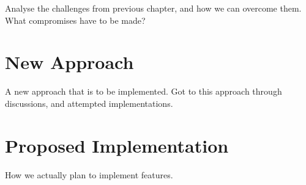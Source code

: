 Analyse the challenges from previous chapter, and how we can overcome them.
What compromises have to be made?

\section{New Approach}

A new approach that is to be implemented. Got to this approach through discussions, and attempted implementations.

\section{Proposed Implementation}

How we actually plan to implement features.